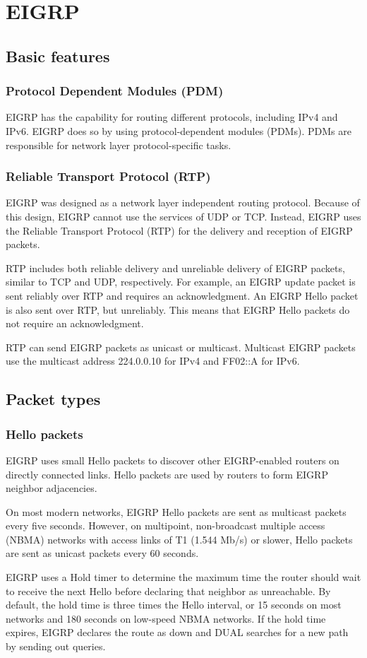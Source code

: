 \chapter{EIGRP}
\section{Basic features}
\subsection{Protocol Dependent Modules (PDM)}
EIGRP has the capability for routing different protocols, including IPv4 and IPv6. EIGRP does so by using protocol-dependent modules (PDMs). PDMs are responsible for network layer protocol-specific tasks. 
\subsection{Reliable Transport Protocol (RTP)}
EIGRP was designed as a network layer independent routing protocol. Because of this design, EIGRP cannot use the services of UDP or TCP. Instead, EIGRP uses the Reliable Transport Protocol (RTP) for the delivery and reception of EIGRP packets. \par 
RTP includes both reliable delivery and unreliable delivery of EIGRP packets, similar to TCP and UDP, respectively. For example, an EIGRP update packet is sent reliably over RTP and requires an acknowledgment. An EIGRP Hello packet is also sent over RTP, but unreliably. This means that EIGRP Hello packets do not require an acknowledgment.\par 
RTP can send EIGRP packets as unicast or multicast. Multicast EIGRP packets use the multicast address 224.0.0.10 for IPv4 and  FF02::A for IPv6.
\section{Packet types}
\subsection{Hello packets}
EIGRP uses small Hello packets to discover other EIGRP-enabled routers on directly connected links. Hello packets are used by routers to form EIGRP neighbor adjacencies.\par 
On most modern networks, EIGRP Hello packets are sent as multicast packets every five seconds. However, on multipoint, non-broadcast multiple access (NBMA) networks with access links of T1 (1.544 Mb/s) or slower, Hello packets are sent as unicast packets every 60 seconds.\par 
EIGRP uses a Hold timer to determine the maximum time the router should wait to receive the next Hello before declaring that neighbor as unreachable. By default, the hold time is three times the Hello interval, or 15 seconds on most networks and 180 seconds on low-speed NBMA networks. If the hold time expires, EIGRP declares the route as down and DUAL searches for a new path by sending out queries.
